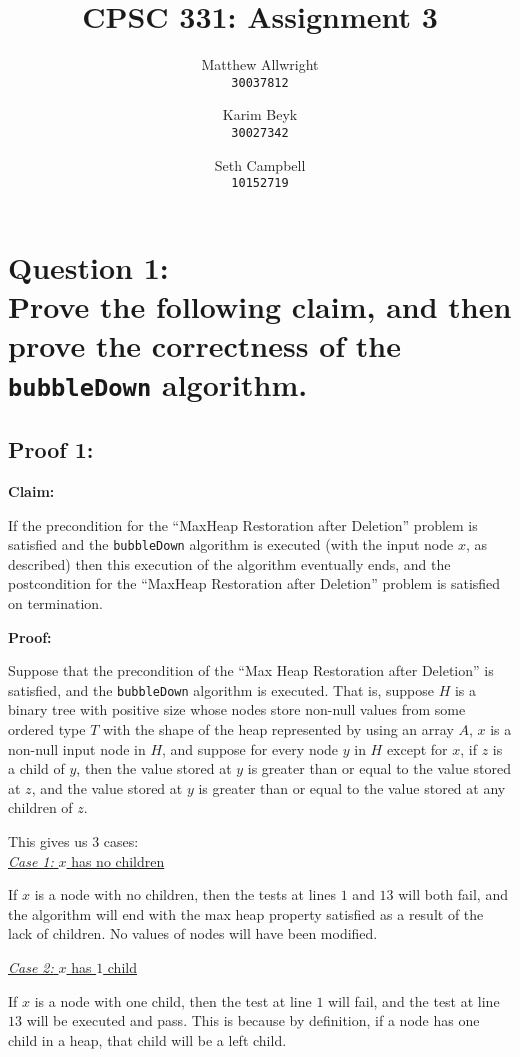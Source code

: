 \documentclass[a4paper, 12pt, titlepage]{article}
\title{CPSC 331: Assignment 3}
\author{
  Matthew Allwright\\
  \texttt{30037812}
  \and
  Karim Beyk\\
  \texttt{30027342}
  \and
  Seth Campbell\\
  \texttt{10152719}
}
\def\code#1{\texttt{#1}}
\begin{document}
\maketitle

\section*{Question 1:\\Prove the following claim, and then prove the correctness of the \code{bubbleDown} algorithm.}

\subsection*{Proof 1:}

\noindent
\textbf{Claim:}

If the precondition for the ``MaxHeap Restoration after Deletion'' problem is satisfied and the \code{bubbleDown} algorithm is executed
(with the input node $x$, as described)
then this execution of the algorithm eventually ends,
and the postcondition for the ``MaxHeap Restoration after Deletion'' problem is satisfied on termination.

\noindent
\textbf{Proof:}

Suppose that the precondition of the ``Max Heap Restoration after Deletion'' is satisfied,
and the \code{bubbleDown} algorithm is executed. 
That is, 
suppose $H$ is a binary tree with positive size whose nodes store non-null values from some ordered type $T$ with the shape of the heap represented by using an array $A$, 
$x$ is a non-null input node in $H$,
and suppose for every node $y$ in $H$ except for $x$,
if $z$ is a child of $y$,
then the value stored at $y$ is greater than or equal to the value stored at $z$,
and the value stored at $y$ is greater than or equal to the value stored at any children of $z$.

This gives us 3 cases:\\

\noindent
\underline{\textit{Case 1:} $x$ has no children}

If $x$ is a node with no children,
then the tests at lines $1$ and $13$ will both fail,
and the algorithm will end with the max heap property satisfied as a result of the lack of children.
No values of nodes will have been modified.

\noindent
\underline{\textit{Case 2:} $x$ has $1$ child}

If $x$ is a node with one child,
then the test at line $1$ will fail,
and the test at line $13$ will be executed and pass.
This is because by definition,
if a node has one child in a heap,
that child will be a left child. 
    
\end{document}
